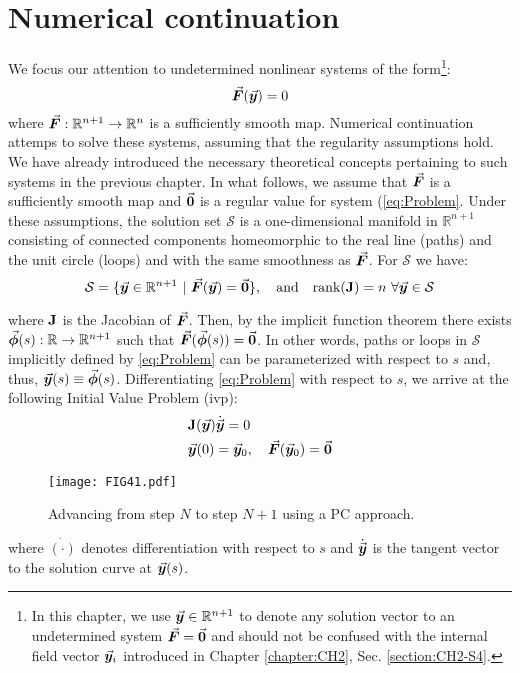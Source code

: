 \section{Numerical continuation}
We focus our attention to undetermined nonlinear systems of the 
form\footnote{In this chapter, we use $\vec{\bm{y}}\in\mathbb{R}^{n+1}$ to denote 
any solution vector to an undetermined system $\vec{\bm{F}}=\vec{\bm{0}}$ and should 
not be confused with the internal field vector $\vec{\bm{y}}_i$ introduced in 
Chapter \ref{chapter:CH2}, Sec. \ref{section:CH2-S4}.}:
\begin{equation}
	\vec{\bm{F}}(\vec{\bm{y}})=0
	\label{eq:Problem}
\end{equation}
where $\vec{\bm{F}}:\mathbb{R}^{n+1}\rightarrow\mathbb{R}^n$ is a sufficiently 
smooth
map. Numerical continuation attemps to solve these systems, assuming that the 
regularity assumptions hold. We have already introduced the necessary 
theoretical concepts pertaining to such systems in the previous chapter. In 
what follows, we assume that $\vec{\bm{F}}$ is a sufficiently smooth map and 
$\vec{\bm{0}}$ is a regular value for system (\ref{eq:Problem}. Under these 
assumptions, the solution set
$\mathcal{S}$ is a one-dimensional manifold in
$\mathbb{R}^{n+1}$ consisting of connected components homeomorphic to the real
line (paths) and the unit circle (loops) and with the same smoothness as
$\vec{\bm{F}}$. For $\mathcal{S}$ we have:
\begin{equation}
	\mathcal{S}=\{\bvec{y}\in\mathbb{R}^{n+1}\ |\ 
	\bvec{F}(\bvec{y})=\bvec{0}\},\quad \text{and}\quad 
	\text{rank}(\bmat{J})=n\ \forall\bvec{y}\in\mathcal{S}
	\label{eq:SolutionSet}
\end{equation}

\noindent where $\mathbf{J}$ is the Jacobian of $\vec{\bm{F}}$. Then,  by the 
implicit
function theorem there exists 
$\vec{\bm{\phi}}(s):\mathbb{R}\rightarrow\mathbb{R}^{n+1}$
such that $\vec{\bm{F}}(\vec{\bm{\phi}}(s))=\vec{\bm{0}}$. In other words, paths or loops in
$\mathcal{S}$ implicitly defined by \ref{eq:Problem} can be parameterized with
respect to $s$ and, thus, $\vec{\bm{y}}(s)\equiv\vec{\bm{\phi}}(s)$. Differentiating 
\ref{eq:Problem} with respect to $s$, we arrive
at the following Initial Value Problem (\acrshort{ivp}):
\begin{subequations}
	\begin{align}
		&\mathbf{J}(\vec{\bm{y}})\dot{\vec{\bm{y}}}=0\label{eq:IVP1}\\
		&\vec{\bm{y}}(0)=\vec{\bm{y}}_0,\quad \vec{\bm{F}}(\vec{\bm{y}}_0)=\vec{\bm{0}}	
		\label{eq:IVP2}
	\end{align}
	\label{eq:IVP}
\end{subequations}
\begin{figure}[t]
	\centering
	\texttt{[image: FIG41.pdf]}
	\caption{Advancing from step $N$ to step $N+1$ using a PC approach.}
	\label{fig:FIG41}
\end{figure}
where $\dot{(\cdot)}$ denotes differentiation with respect to $s$ and 
$\dot{\vec{\bm{y}}}$ is the tangent vector to the solution curve at $\vec{\bm{y}}(s)$. 

